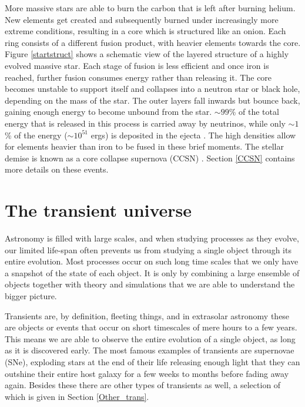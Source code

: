 \documentclass[a4paper,oneside,12pt, class=Latex/Classes/PhDthesisPSnPDF, crop=false]{standalone}
\begin{document}
More massive stars are able to burn the carbon that is left after burning helium. New elements get created and subsequently burned under increasingly more extreme conditions, resulting in a core which is structured like an onion. Each ring consists of a different fusion product, with heavier elements towards the core. Figure \ref{startstruct} shows a schematic view of the layered structure of a highly evolved massive star. Each stage of fusion is less efficient and once iron is reached, further fusion consumes energy rather than releasing it. The core becomes unstable to support itself and collapses into a neutron star or black hole, depending on the mass of the star. The outer layers fall inwards but bounce back, gaining enough energy to become unbound from the star. $\sim99$\% of the total energy that is released in this process is carried away by neutrinos, while only $\sim1$\% of the energy ($\sim10^{51}$ ergs) is deposited in the ejecta \citep{CCSN_neutrino_overview}. The high densities allow for elements heavier than iron to be fused in these brief moments. The stellar demise is known as a core collapse supernova (CCSN) \citep{starstruct}. Section \ref{CCSN} contains more details on these events.


\section{The transient universe}
Astronomy is %
filled with large scales, and when studying processes %
as they evolve, our limited life-span %
often prevents us from studying a single object through its entire evolution. Most processes %
occur on such long time scales that %
we only have a snapshot of the state of each object. It is %
only by combining a large ensemble of objects together with theory and simulations that we are able to understand the bigger picture.

Transients are, by definition, fleeting things, and in extrasolar astronomy these are objects or events that occur on short timescales of mere hours to a few years. This means we are able to observe the entire evolution of a single object, as long as it is discovered early. The most famous examples of transients are supernovae (SNe), exploding stars at the end of their life releasing enough light that they can outshine their entire host galaxy for a few weeks to months before fading away again. Besides these there are other types of transients as well, a selection of which is given in Section \ref{Other_trans}.
\end{document}
